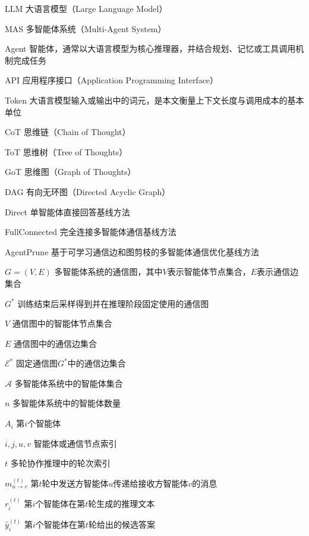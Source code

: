 
\begin{symbols}
  \item[LLM] 大语言模型（Large Language Model）
  \item[MAS] 多智能体系统（Multi-Agent System）
  \item[Agent] 智能体，通常以大语言模型为核心推理器，并结合规划、记忆或工具调用机制完成任务
  \item[API] 应用程序接口（Application Programming Interface）
  \item[Token] 大语言模型输入或输出中的词元，是本文衡量上下文长度与调用成本的基本单位
  \item[CoT] 思维链（Chain of Thought）
  \item[ToT] 思维树（Tree of Thoughts）
  \item[GoT] 思维图（Graph of Thoughts）
  \item[DAG] 有向无环图（Directed Acyclic Graph）
  \item[Direct] 单智能体直接回答基线方法
  \item[FullConnected] 完全连接多智能体通信基线方法
  \item[AgentPrune] 基于可学习通信边和图剪枝的多智能体通信优化基线方法
  \item[$G=(V,E)$] 多智能体系统的通信图，其中$V$表示智能体节点集合，$E$表示通信边集合
  \item[$G^\ast$] 训练结束后采样得到并在推理阶段固定使用的通信图
  \item[$V$] 通信图中的智能体节点集合
  \item[$E$] 通信图中的通信边集合
  \item[$\mathcal{E}^\ast$] 固定通信图$G^\ast$中的通信边集合
  \item[$\mathcal{A}$] 多智能体系统中的智能体集合
  \item[$n$] 多智能体系统中的智能体数量
  \item[$A_i$] 第$i$个智能体
  \item[$i,j,u,v$] 智能体或通信节点索引
  \item[$t$] 多轮协作推理中的轮次索引
  \item[$m_{u\to v}^{(t)}$] 第$t$轮中发送方智能体$u$传递给接收方智能体$v$的消息
  \item[$r_i^{(t)}$] 第$i$个智能体在第$t$轮生成的推理文本
  \item[$\hat{y}_i^{(t)}$] 第$i$个智能体在第$t$轮给出的候选答案

\end{symbols}
